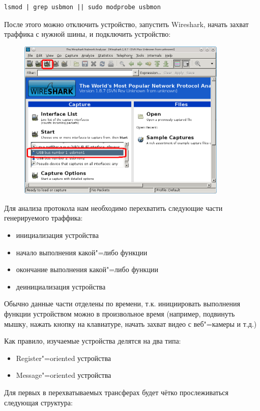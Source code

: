\documentclass[10pt, a5paper]{article}
\begin{document}
\begin{verbatim}
lsmod | grep usbmon || sudo modprobe usbmon
\end{verbatim}
После этого можно отключить устройство, запустить Wireshark, начать захват траффика с нужной шины, и подключить устройство:

\begin{figure}
  \centering
  \includegraphics[width=10cm]{12_wireshark.png}
\end{figure}

Для анализа протокола нам необходимо перехватить следующие части генерируемого траффика:

\begin{itemize}
  \item инициализация устройства
  \item начало выполнения какой"=либо функции
  \item окончание выполнения какой"=либо функции
  \item деинициализация устройства
\end{itemize}

Обычно данные части отделены по времени, т.к. инициировать выполнения функции устройством можно в произвольное время (например, подвинуть мышку, нажать кнопку на клавиатуре, начать захват видео с веб"=камеры и т.д.)

Как правило, изучаемые устройства делятся на два типа:

\begin{itemize}
  \item Register"=oriented устройства
  \item Message"=oriented устройства
\end{itemize}

Для первых в перехватываемых трансферах будет чётко прослеживаться следующая структура:
\end{document}
